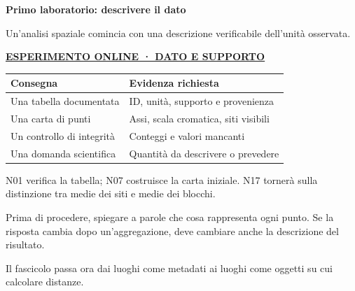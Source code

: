 \documentclass[12pt,aspectratio=1610]{beamer}
\newcommand{\PBody}[1]{\par{\fontsize{11.3}{14.8}\selectfont #1\par}}
\newcommand{\PSmall}[1]{\par{\fontsize{9.8}{13.1}\selectfont #1\par}}
\newcommand{\PInfo}[1]{%
\begin{tcolorbox}[enhanced,arc=1.6mm,boxrule=.55pt,colback=GeoTint,
 colframe=Rule!80!Classical,left=2.3mm,right=2.3mm,top=2mm,bottom=2mm,
 before skip=1mm,after skip=1mm]
\PSmall{#1}\end{tcolorbox}}
\newcommand{\PLab}[2]{\par{\color{Classical}\bfseries\fontsize{9}{11}\selectfont
\href{#1}{\MakeUppercase{#2}}}\par\vspace{1.8mm}}
\begin{document}
\begin{frame}[plain]\hypertarget{slide16}{}
\begin{lrbox}{\TitleBox}
\begin{minipage}[t]{17.7cm}\raggedright\color{Ink}\fontsize{11.3}{14.8}\selectfont
\color{Navy}\bfseries\fontsize{20.6}{24.5}\selectfont Primo laboratorio: descrivere il dato
\end{minipage}\end{lrbox}

\begin{lrbox}{\RecallBox}
\begin{minipage}[t]{14.3cm}\raggedright\color{Ink}\fontsize{11.3}{14.8}\selectfont
\fontsize{10.3}{13.8}\selectfont Un’analisi spaziale comincia con una descrizione verificabile dell’unità osservata.
\end{minipage}\end{lrbox}

\begin{lrbox}{\PilotLeftBox}
\begin{minipage}[t]{10.05cm}\raggedright\color{Ink}\fontsize{11.3}{14.8}\selectfont
\PLab{https://marzione00.github.io/Lab_Geo/\#laboratorio/m11-supporto}{Esperimento online · dato e supporto}
{\fontsize{10.2}{13.1}\selectfont\renewcommand{\arraystretch}{1.45}\begin{tabular}{@{}p{3.7cm}p{5.3cm}@{}}\toprule
\textbf{Consegna} & \textbf{Evidenza richiesta}\\\midrule
Una tabella documentata & ID, unità, supporto e provenienza\\
Una carta di punti & Assi, scala cromatica, siti visibili\\
Un controllo di integrità & Conteggi e valori mancanti\\
Una domanda scientifica & Quantità da descrivere o prevedere\\
\bottomrule\end{tabular}}

\end{minipage}\end{lrbox}

\begin{lrbox}{\PilotRightBox}
\begin{minipage}[t]{7.55cm}\raggedright\color{Ink}\fontsize{11.3}{14.8}\selectfont
\PBody{N01 verifica la tabella; N07 costruisce la carta iniziale. N17 tornerà sulla distinzione tra medie dei siti e medie dei blocchi.}
\vspace{2.5mm}
\PInfo{Prima di procedere, spiegare a parole che cosa rappresenta ogni punto. Se la risposta cambia dopo un’aggregazione, deve cambiare anche la descrizione del risultato.}
\PBody{Il fascicolo passa ora dai luoghi come metadati ai luoghi come oggetti su cui calcolare distanze.}
\vspace{2.5mm}


\end{minipage}
\end{lrbox}
\end{frame}
\end{document}
